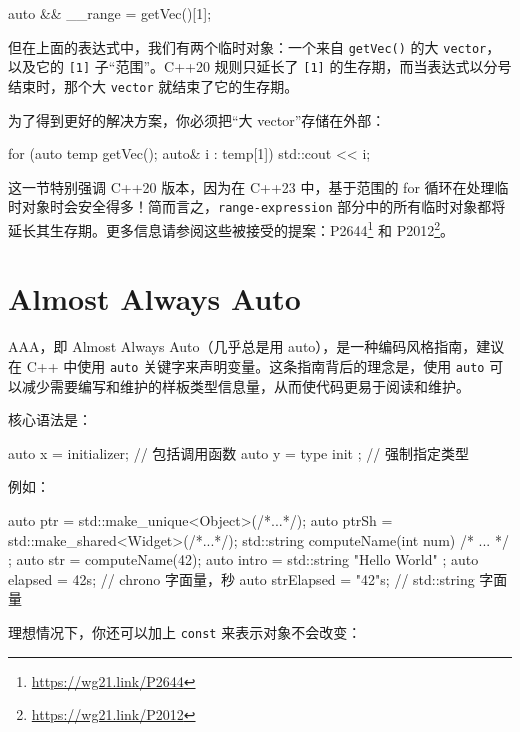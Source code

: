 \begin{codebox}[cpp]
auto && __range = getVec()[1];
\end{codebox}

但在上面的表达式中，我们有两个临时对象：一个来自 \texttt{getVec()} 的大 \texttt{vector}，以及它的 \texttt{[1]} 子“范围”。C++20 规则只延长了 \texttt{[1]} 的生存期，而当表达式以分号结束时，那个大 \texttt{vector} 就结束了它的生存期。

为了得到更好的解决方案，你必须把“大 vector”存储在外部：

\begin{codebox}[cpp]
for (auto temp getVec(); auto& i : temp[1])
std::cout << i;
\end{codebox}

\begin{myInfoBox}
这一节特别强调 C++20 版本，因为在 C++23 中，基于范围的 for 循环在处理临时对象时会安全得多！简而言之，\texttt{range-expression} 部分中的所有临时对象都将延长其生存期。更多信息请参阅这些被接受的提案：P2644\footnote{\url{https://wg21.link/P2644}} 和 P2012\footnote{\url{https://wg21.link/P2012}}。
\end{myInfoBox}


\section{Almost Always Auto}

AAA，即 Almost Always Auto（几乎总是用 auto），是一种编码风格指南，建议在 C++ 中使用 \texttt{auto} 关键字来声明变量。这条指南背后的理念是，使用 \texttt{auto} 可以减少需要编写和维护的样板类型信息量，从而使代码更易于阅读和维护。

核心语法是：

\begin{codebox}[cpp]
auto x = initializer;
// 包括调用函数
auto y = type{ init }; // 强制指定类型
\end{codebox}

例如：

\begin{codebox}[cpp]
auto ptr
= std::make_unique<Object>(/*...*/);
auto ptrSh = std::make_shared<Widget>(/*...*/);
std::string computeName(int num) { /* ... */ };
auto str = computeName(42);
auto intro
= std::string { "Hello World" };
auto elapsed
= 42s;
// chrono 字面量，秒
auto strElapsed = "42"s;
// std::string 字面量
\end{codebox}

理想情况下，你还可以加上 \texttt{const} 来表示对象不会改变：

